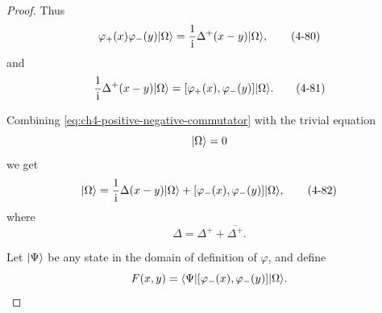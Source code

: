 \begin{proof}
Thus
\begin{equation}
  \varphi_+(x)\varphi_-(y)\lvert \Omega\rangle
  =\frac{1}{\mathrm{i}}\Delta^+(x-y)\lvert \Omega\rangle,
  \tag{4-80}\label{eq:ch4-positive-negative-action}
\end{equation}
and
\begin{equation}
  \frac{1}{\mathrm{i}}\Delta^+(x-y)\lvert \Omega\rangle
  =[\varphi_+(x),\varphi_-(y)]\lvert \Omega\rangle.
  \tag{4-81}\label{eq:ch4-positive-negative-commutator}
\end{equation}

Combining \eqref{eq:ch4-positive-negative-commutator} with the trivial equation
\begin{equation*}
  [\varphi_+(x),\varphi_+(y)]\ket{\Omega}=0
\end{equation*}
we get
\begin{equation}
  [\varphi(x),\varphi(y)]\ket{\Omega}
  =\frac{1}{\ii}\Delta(x-y)\ket{\Omega}
  +[\varphi_-(x),\varphi_-(y)]\ket{\Omega},
  \tag{4-82}\label{eq:ch4-commutator-decomposition}
\end{equation}
where
\begin{equation*}
  \Delta=\Delta^+ +\overline{\Delta^+}.
\end{equation*}

Let $\lvert \Psi\rangle$ be any state in the domain of definition of $\varphi$, and
define
\begin{equation*}
  F(x,y)=\langle \Psi\rvert[\varphi_-(x),\varphi_-(y)]\lvert \Omega\rangle.
\end{equation*}


\end{proof}
